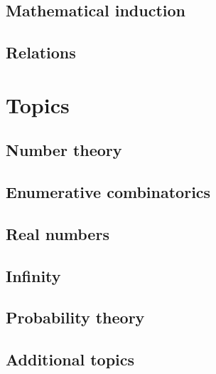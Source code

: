 \documentclass[10pt]{book}
\begin{document}
\chapter{Mathematical induction}
    \label{chMathematicalInduction}
    

\chapter{Relations}
    \label{chRelations}
    

\part{Topics}
\label{ptTopics}

\chapter{Number theory}
    \label{chNumberTheory}
    

\chapter{Enumerative combinatorics}
    \label{chCombinatorics}
    
    
\chapter{Real numbers}
    \label{chRealNumbers}
    
    
\chapter{Infinity}
    \label{chInfinity}
    
    
\chapter{Probability theory}
    \label{chProbabilityTheory}
    
    
\chapter{Additional topics}
    \label{chAdditionalTopics}
    
\end{document}
